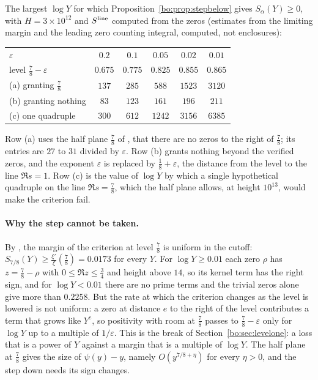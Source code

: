 \begin{computation}\label{bo:comp:stepbelow}
The largest $\log Y$ for which Proposition~\ref{bo:prop:stepbelow} gives $S_\alpha(Y)\ge0$, with $H=3\times10^{12}$ and $S^{\rm line}$ computed from the zeros (estimates from the limiting margin and the leading zero counting integral, computed, not enclosures):
\begin{center}\small
\begin{tabular}{@{}lccccc@{}}
\toprule
$\varepsilon$ & $0.2$ & $0.1$ & $0.05$ & $0.02$ & $0.01$\\
level $\frac78-\varepsilon$ & $0.675$ & $0.775$ & $0.825$ & $0.855$ & $0.865$\\
\midrule
(a) granting $\frac78$ & $137$ & $285$ & $588$ & $1523$ & $3120$\\
(b) granting nothing & $83$ & $123$ & $161$ & $196$ & $211$\\
(c) one quadruple & $300$ & $612$ & $1242$ & $3156$ & $6385$\\
\bottomrule
\end{tabular}
\end{center}
Row (a) uses the half plane $\frac78$ of \cite{OAI26a}, that there are no zeros to the right of $\frac78$; its entries are $27$ to $31$ divided by $\varepsilon$. Row (b) grants nothing beyond the verified zeros, and the exponent $\varepsilon$ is replaced by $\frac18+\varepsilon$, the distance from the level to the line $\Re s=1$. Row (c) is the value of $\log Y$ by which a single hypothetical quadruple on the line $\Re s=\frac78$, which the half plane allows, at height $10^{13}$, would make the criterion fail.
\end{computation}

\paragraph{Why the step cannot be taken.} By \cite{OAI26a}, the margin of the criterion at level $\frac78$ is uniform in the cutoff: $S_{7/8}(Y)\ge\frac{\xi'}{\xi}(\frac78)=0.0173$ for every $Y$. For $\log Y\ge0.01$ each zero $\rho$ has $z=\frac78-\rho$ with $0\le\Re z\le\frac34$ and height above $14$, so its kernel term has the right sign, and for $\log Y<0.01$ there are no prime terms and the trivial zeros alone give more than $0.2258$. But the rate at which the criterion changes as the level is lowered is not uniform: a zero at distance $e$ to the right of the level contributes a term that grows like $Y^{e}$, so positivity with room at $\frac78$ passes to $\frac78-\varepsilon$ only for $\log Y$ up to a multiple of $1/\varepsilon$. This is the break of Section~\ref{bo:sec:levelone}: a loss that is a power of $Y$ against a margin that is a multiple of $\log Y$. The half plane at $\frac78$ gives the size of $\psi(y)-y$, namely $O(y^{7/8+\eta})$ for every $\eta>0$, and the step down needs its sign changes.

